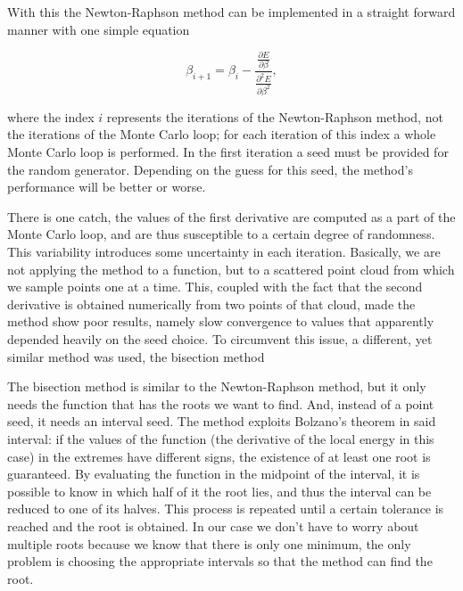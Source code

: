 		With this the Newton-Raphson method can be implemented in a straight forward manner with one simple equation

		\begin{equation}
		\beta_{i+1}=\beta_i-\frac{\frac{\partial E}{\partial\beta}}{\frac{\partial^2 E}{\partial\beta^2}},
		\end{equation}

		where the index $i$ represents the iterations of the Newton-Raphson method, not the iterations of the Monte Carlo loop; for each iteration of this index a whole Monte Carlo loop is performed. In the first iteration a seed must be provided for the random generator. Depending on the guess for this seed, the method's performance will be better or worse.

		There is one catch, the values of the first derivative are computed as a part of the Monte Carlo loop, and are thus susceptible to a certain degree of randomness. This variability introduces some uncertainty in each iteration. Basically, we are not applying the method to a function, but to a scattered point cloud from which we sample points one at a time. This, coupled with the fact that the second derivative is obtained numerically from two points of that cloud, made the method show poor results, namely slow convergence to values that apparently depended heavily on the seed choice. To circumvent this issue, a different, yet similar method was used, the bisection method

		The bisection method is similar to the Newton-Raphson method, but it only needs the function that has the roots we want to find. And, instead of a point seed, it needs an interval seed. The method exploits Bolzano's theorem in said interval: if the values of the function (the derivative of the local energy in this case) in the extremes have different signs, the existence of at least one root is guaranteed. By evaluating the function in the midpoint of the interval, it is possible to know in which half of it the root lies, and thus the interval can be reduced to one of its halves. This process is repeated until a certain tolerance is reached and the root is obtained. In our case we don't have to worry about multiple roots because we know that there is only one minimum, the only problem is choosing the appropriate intervals so that the method can find the root.


